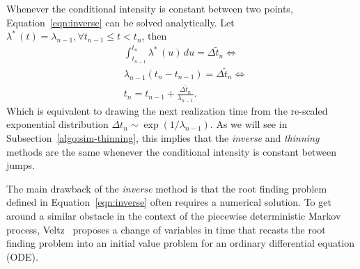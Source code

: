 \documentclass{juliacon}
\begin{document}
Whenever the conditional intensity is constant between two points, Equation~\ref{eqn:inverse} can be solved analytically. Let \( \lambda^\ast \, (t) = \lambda_{n-1} , \forall t_{n-1} \leq t < t_n \), then
\[
\begin{split}
  &\int_{t_{n-1}}^{t_n} \lambda^\ast \, (u) \, du = \Delta \tilde{t}_{n} \iff \\
  &\lambda_{n-1} (t_n - t_{n-1}) = \Delta \tilde{t}_n \iff \\
  &t_n = t_{n-1} + \frac{\Delta \tilde{t}_n}{\lambda_{n-1}}.
\end{split}
\]
Which is equivalent to drawing the next realization time from the re-scaled exponential distribution \( \Delta t_n \sim \exp(1/\lambda_{n-1}) \). As we will see in Subsection~\ref{algo:sim-thinning}, this implies that the \textit{inverse} and \textit{thinning} methods are the same whenever the conditional intensity is constant between jumps.

The main drawback of the \textit{inverse} method is that the root finding problem defined in Equation~\ref{eqn:inverse} often requires a numerical solution. To get around a similar obstacle in the context of the piecewise deterministic Markov process, Veltz~\cite{veltz2015} proposes a change of variables in time that recasts the root finding problem into an initial value problem for an ordinary differential equation (ODE).
\end{document}
